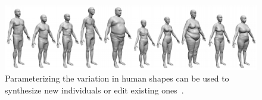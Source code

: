 \begin{figure}[t]
\centering
    \includegraphics[width=1.0\columnwidth]{fig/img/allen_sig03_human.pdf}
    \caption{Parameterizing the variation in human shapes can be used to synthesize new individuals or edit existing ones~\protect\cite{Allen:2003:SHB}.}
    \label{fig:allen_sig03_human}
\end{figure}

